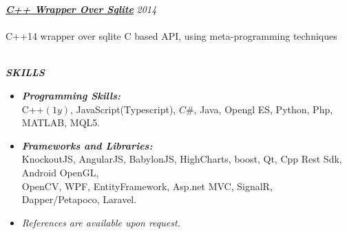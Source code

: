 \documentclass{article}
\newcommand{\hh}[1]{\large{\textit{\textbf{#1}}}}
\newcommand{\hhh}[1]{\Large{\textit{\textbf{#1}}}}
\newcommand{\h}[1]{\normalsize{\textit{\textbf{#1}}}}
\renewcommand{\i}[1]{\normalsize{\textit{#1}}}
\begin{document}
\hh{\href{https://github.com/aminroosta/sqlite_modern_cpp}{C++ Wrapper Over Sqlite}}
\hfill \i{2014} \\ \vspace {-.35cm} \\
C++14 wrapper over sqlite C based API, using meta-programming techniques \\ \vspace{-.35cm} \\

\vspace{.1cm}
 \centerline{\hhh{SKILLS}}
\vspace{-.5cm}
\begin{itemize}
 \setlength{\itemsep}{3pt} \setlength{\parskip}{0pt} \setlength{\parsep}{0pt}
 \item \h{Programming Skills:} \\
 C++$(1y)$, JavaScript(Typescript), $C\#$, Java, Opengl ES, Python, Php, MATLAB, MQL5.
 \item \h{Frameworks and Libraries:} \\
 KnockoutJS, AngularJS, BabylonJS, HighCharts, boost, Qt, Cpp Rest Sdk, Android OpenGL, \\
 OpenCV, WPF, EntityFramework, Asp.net MVC, SignalR, Dapper/Petapoco, Laravel.
\end{itemize}

\begin{itemize}
 \item \textit{References are available upon request.}
\end{itemize}
\end{document}
